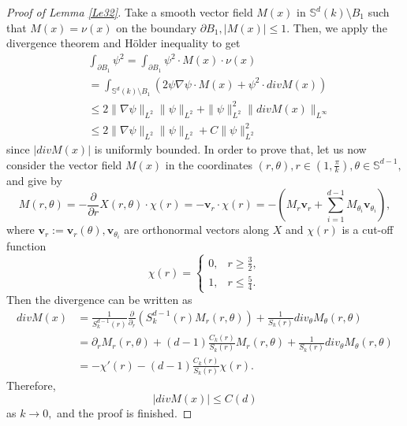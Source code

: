 \documentclass[reqno]{amsart}
\numberwithin{equation}{section}
\newenvironment{key words}{\textbf{Keywords}\mbox{  }}{ }
\begin{document}
\begin{proof}[Proof of Lemma \ref{Le32}]

Take a smooth vector field $M(x)$ in $\mathbb{S}^{d}(k)\setminus B_{1}$ such that $M(x)=\nu(x)$ on the boundary $\partial B_{1},|M(x)|\leq1.$ Then, we apply the divergence theorem and H\"{o}lder inequality to get
 \begin{align*}
 & \int_{\partial B_{1}}\psi^2= \int_{\partial B_{1}}\psi^2\cdot M(x)\cdot\nu(x)\\
 &=\int_{\mathbb{S}^{d}(k)\setminus B_{1}} \left(2\psi\nabla \psi\cdot M(x)+\psi^2\cdot div M(x)\right)\\
 &\leq2\|\nabla \psi\|_{L^{2}}\|\psi\|_{L^{2}}+\|\psi\|^{2}_{L^{2}}\| div M(x)\|_{L^{\infty}}\\
 &\leq 2\|\nabla \psi\|_{L^{2}}\|\psi\|_{L^{2}}+C\|\psi\|^{2}_{L^{2}}
\end{align*}
since $| div M(x)|$ is uniformly bounded. In order to prove that, let us now consider the vector field $M(x)$ in the coordinates $(r,\theta),r\in(1,\frac{\pi}{k}),\theta\in\mathbb{S}^{d-1},$ and give by
$$M(r,\theta)=-\frac{\partial}{\partial r}X(r,\theta)\cdot\chi(r)=-\textbf{v}_{r}\cdot\chi(r)=-\left(M_{r}\textbf{v}_{r}+\sum\limits_{i=1}^{d-1}M_{\theta_i}\textbf{v}_{\theta_i}\right),$$
where $\textbf{v}_{r}:=\textbf{v}_{r}(\theta),\textbf{v}_{\theta_i}$ are orthonormal vectors along $X$ and $\chi(r)$ is a cut-off function
\begin{equation*}
	 \chi(r)=
	\begin{cases}
	0, &r \geq\frac{3}{2},\\
	1, &r \leq\frac{5}{4}.
	\end{cases}
	\end{equation*}	
Then the divergence can be written as
 \begin{align*}
 div M(x) &=\frac{1}{S_{k}^{d-1}(r)}\frac{\partial}{\partial_{r}}(S_{k}^{d-1}(r)M_{r}(r,\theta))+\frac{1}{S_{k}(r)}div_{\theta} M_{\theta}(r,\theta)\\
 &=\partial_{r}M_{r}(r,\theta)+(d-1)\frac{C_{k}(r)}{S_{k}(r)}M_{r}(r,\theta)+\frac{1}{S_{k}(r)}div_{\theta} M_{\theta}(r,\theta)\\
 &=-\chi'(r)-(d-1)\frac{C_{k}(r)}{S_{k}(r)}\chi(r).
\end{align*}
Therefore,
 $$|div M(x)|\leq C(d)$$
 as $k\rightarrow0,$ and the proof is finished.
\end{proof}
\end{document}
